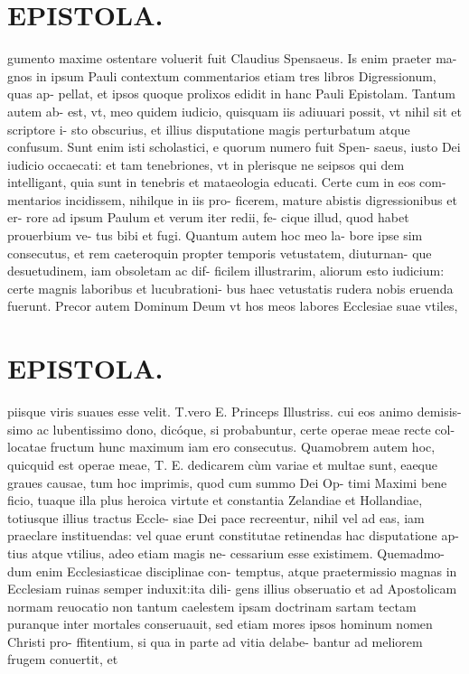 \documentclass{article}
\begin{document}
\begin{pages}
\section*{EPISTOLA. }\pstart gumento maxime ostentare voluerit fuit Claudius Spensaeus. Is enim praeter ma- gnos in ipsum Pauli contextum commentarios etiam tres libros Digressionum, quas ap- pellat, et ipsos quoque prolixos edidit in hanc Pauli Epistolam. Tantum autem ab- est, vt, meo quidem iudicio, quisquam iis adiuuari possit, vt nihil sit et scriptore i- sto obscurius, et illius disputatione magis perturbatum atque confusum. Sunt enim isti scholastici, e quorum numero fuit Spen- saeus, iusto Dei iudicio occaecati: et tam tenebriones, vt in plerisque ne seipsos qui dem intelligant, quia sunt in tenebris et mataeologia educati. Certe cum in eos com- mentarios incidissem, nihilque in iis pro- ficerem, mature abistis digressionibus et er- rore ad ipsum Paulum et verum iter redii, fe- cique illud, quod habet prouerbium ve- tus bibi et fugi. Quantum autem hoc meo la- bore ipse sim consecutus, et rem caeteroquin propter temporis vetustatem, diuturnan- que desuetudinem, iam obsoletam ac dif- ficilem illustrarim, aliorum esto iudicium: certe magnis laboribus et lucubrationi- bus haec vetustatis rudera nobis eruenda fuerunt. Precor autem Dominum Deum vt hos meos labores Ecclesiae suae vtiles,  \pend
\section*{EPISTOLA. }\pstart piisque viris suaues esse velit. T.vero E. Princeps Illustriss. cui eos animo demisis- simo ac lubentissimo dono, dicóque, si probabuntur, certe operae meae recte col- locatae fructum hunc maximum iam ero consecutus. Quamobrem autem hoc, quicquid est operae meae, T. E. dedicarem cùm variae et multae sunt, eaeque graues causae, tum hoc imprimis, quod cum summo Dei Op- timi Maximi bene ficio, tuaque illa plus heroica virtute et constantia Zelandiae et Hollandiae, totiusque illius tractus Eccle- siae Dei pace recreentur, nihil vel ad eas, iam praeclare instituendas: vel quae erunt constitutae retinendas hac disputatione ap- tius atque vtilius, adeo etiam magis ne- cessarium esse existimem. Quemadmo- dum enim Ecclesiasticae disciplinae con- temptus, atque praetermissio magnas in Ecclesiam ruinas semper induxit:ita dili- gens illius obseruatio et ad Apostolicam normam reuocatio non tantum caelestem ipsam doctrinam sartam tectam puranque inter mortales conseruauit, sed etiam mores ipsos hominum nomen Christi pro- ffitentium, si qua in parte ad vitia delabe- bantur ad meliorem frugem conuertit, et  \pend

\end{pages}
\end{document}
